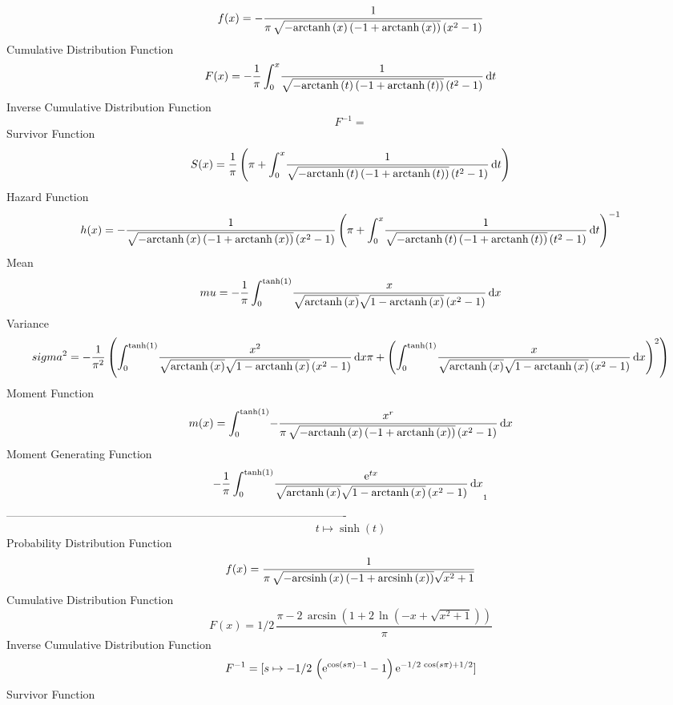 \documentclass[12pt]{article}
\begin{document}
$$  f(x)=-{\frac {1}{\pi\,\sqrt {-{\rm arctanh} \left(x\right) \left( -1+
{\rm arctanh} \left(x\right) \right) } \left( {x}^{2}-1 \right) }}
$$Cumulative Distribution Function  
 $$F(x)=-{\frac {1}{\pi}\int_{0}^{x}\!{\frac {1}{\sqrt {-{\rm arctanh} \left(t
\right) \left( -1+{\rm arctanh} \left(t\right) \right) } \left( {t}^{2
}-1 \right) }}\,{\rm d}t}
$$ Inverse Cumulative Distribution Function 
  $$F^{-1} = $$Survivor Function 
 $$ S(x)={\frac {1}{\pi} \left( \pi+\int_{0}^{x}\!{\frac {1}{\sqrt {-
{\rm arctanh} \left(t\right) \left( -1+{\rm arctanh} \left(t\right)
 \right) } \left( {t}^{2}-1 \right) }}\,{\rm d}t \right) }
$$ Hazard Function 
 $$ h(x)=-{\frac {1}{\sqrt {-{\rm arctanh} \left(x\right) \left( -1+
{\rm arctanh} \left(x\right) \right) } \left( {x}^{2}-1 \right) }
 \left( \pi+\int_{0}^{x}\!{\frac {1}{\sqrt {-{\rm arctanh} \left(t
\right) \left( -1+{\rm arctanh} \left(t\right) \right) } \left( {t}^{2
}-1 \right) }}\,{\rm d}t \right) ^{-1}}
$$ Mean 
 $$ mu=-{\frac {1}{\pi}\int_{0}^{\tanh \left( 1 \right) }\!{\frac {x}{\sqrt {
{\rm arctanh} \left(x\right)}\sqrt {1-{\rm arctanh} \left(x\right)}
 \left( {x}^{2}-1 \right) }}\,{\rm d}x}
$$ Variance 
 $$ sigma^2 = -{\frac {1}{{\pi}^{2}} \left( \int_{0}^{\tanh \left( 1 \right) }\!{
\frac {{x}^{2}}{\sqrt {{\rm arctanh} \left(x\right)}\sqrt {1-
{\rm arctanh} \left(x\right)} \left( {x}^{2}-1 \right) }}\,{\rm d}x\pi
+ \left( \int_{0}^{\tanh \left( 1 \right) }\!{\frac {x}{\sqrt {
{\rm arctanh} \left(x\right)}\sqrt {1-{\rm arctanh} \left(x\right)}
 \left( {x}^{2}-1 \right) }}\,{\rm d}x \right) ^{2} \right) }
$$ Moment Function 
 $$ m(x) = \int_{0}^{\tanh \left( 1 \right) }\!-{\frac {{x}^{r}}{\pi\,\sqrt {-
{\rm arctanh} \left(x\right) \left( -1+{\rm arctanh} \left(x\right)
 \right) } \left( {x}^{2}-1 \right) }}\,{\rm d}x
$$ Moment Generating Function 
 $$-{\frac {1}{\pi}\int_{0}^{\tanh \left( 1 \right) }\!{\frac {{{\rm e}^{
tx}}}{\sqrt {{\rm arctanh} \left(x\right)}\sqrt {1-{\rm arctanh} 
\left(x\right)} \left( {x}^{2}-1 \right) }}\,{\rm d}x}_{{1}}
$$-------------------------------------------------------------------------------------------  \\$$t\mapsto \sinh \left( t \right) 
$$Probability Distribution Function 
$$  f(x)={\frac {1}{\pi\,\sqrt {-{\rm arcsinh} \left(x\right) \left( -1+
{\rm arcsinh} \left(x\right) \right) }\sqrt {{x}^{2}+1}}}
$$Cumulative Distribution Function  
 $$F(x)=1/2\,{\frac {\pi-2\,\arcsin \left( 1+2\,\ln  \left( -x+\sqrt {{x}^{2}+
1} \right)  \right) }{\pi}}
$$ Inverse Cumulative Distribution Function 
  $$F^{-1} = [s\mapsto -1/2\, \left( {{\rm e}^{\cos \left( s\pi \right) -1}}-1
 \right) {{\rm e}^{-1/2\,\cos \left( s\pi \right) +1/2}}]
$$Survivor Function 
\end{document}
